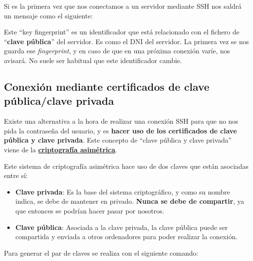 Si es la primera vez que nos conectamos a un servidor mediante SSH nos saldrá un mensaje como el siguiente:


Este “key fingerprint” es un identificador que está relacionado con el fichero de “\textbf{clave pública}” del servidor. Es como el DNI del servidor. La primera vez se nos guarda ese \textit{fingerprint}, y en caso de que en una próxima conexión varíe, nos avisará. No suele ser habitual que este identificador cambie.



\subsection{Conexión mediante certificados de clave pública/clave privada}

Existe una alternativa a la hora de realizar una conexión SSH para que no nos pida la contraseña del usuario, y es \textbf{hacer uso de los certificados de clave pública y clave privada}. Este concepto de “clave pública y clave privada” viene de la \href{https://es.wikipedia.org/wiki/Criptograf%C3%ADa_asim%C3%A9trica}{\textbf{criptografía asimétrica}}.

Este sistema de criptografía asimétrica hace uso de dos claves que están asociadas entre sí:
\begin{itemize}
    \item \textbf{Clave privada}: Es la base del sistema criptográfico, y como su nombre indica, se debe de mantener en privado. \textbf{Nunca se debe de compartir}, ya que entonces se podrían hacer pasar por nosotros.
    \item \textbf{Clave pública}: Asociada a la clave privada, la clave pública puede ser compartida y enviada a otros ordenadores para poder realizar la conexión.
\end{itemize}

Para generar el par de claves se realiza con el siguiente comando:

